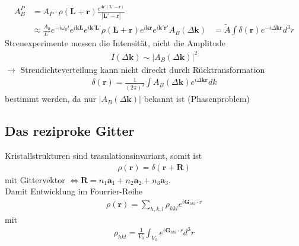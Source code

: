 \begin{itemize}
          \begin{align*}
              A_B^P                   & = A_P \cdot \rho(\textbf{L} + \textbf{r}) \frac{e^{i\textbf{k}' ( \textbf{L}' - \textbf{r})}}{|\textbf{L}' - \textbf{r}|}                                                                   \\
                                      & \approx \frac{A_0}{L'} e^{-i \omega_0 t} e^{i \textbf{k} \textbf{L}} e^{i \textbf{k}' \textbf{L}'} \rho(\textbf{L} + \textbf{r})  e^{i \textbf{k} \textbf{r}} e^{i \textbf{k}' \textbf{r}'}
              A_B (\Delta \textbf{k}) & = \tilde{A} \int \delta(\textbf{r})e^{-i \Delta\textbf{kr}}d^3r
          \end{align*}
          Streuexperimente messen die Intensität, nicht die Amplitude
          \begin{align*}
              I(\Delta \textbf{k}) \sim \left| A_B(\Delta \textbf{k}) \right|^2
          \end{align*}
          $\rightarrow$ Streudichteverteilung kann nicht direckt durch Rücktransformation
          \begin{align*}
              \delta(\textbf{r}) = \frac{1}{(2\pi)^3}\int A_B(\Delta \textbf{k}) e^{i \Delta\textbf{kr}} dk
          \end{align*}
          bestimmt werden, da nur $\left|A_B(\Delta \textbf{k}) \right|$ bekannt ist (Phasenproblem)
\end{itemize}




\subsection{Das reziproke Gitter} \label{kap:3_2}
Kristallstrukturen sind trasnlationsinvariant, somit ist
\begin{align*}
    \rho(\textbf{r}) = \delta(\textbf{r}+\textbf{R})
\end{align*}
mit Gittervektor $\Leftrightarrow \textbf{R} = n_1 \textbf{a}_1 + n_2 \textbf{a}_2 + n_3 \textbf{a}_3$.\\
Damit Entwicklung im Fourrier-Reihe
\begin{align*}
    \rho(\textbf{r}) = \sum_{h,k,l}\rho_{hkl} e^{i \textbf{G}_{hkl}\cdot r}
\end{align*}
mit
\begin{align*}
    \rho_{hkl} = \frac{1}{V_0}\int_{V_0}e^{i \textbf{G}_{hkl}\cdot r}d^3r
\end{align*}

